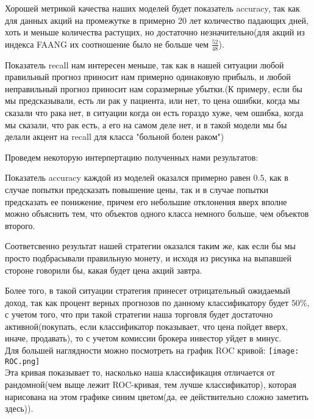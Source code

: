 \documentclass[12pt]{article}
\begin{document}
{Хорошей метрикой качества наших моделей будет показатель accuracy, так как для данных акций на промежутке в примерно 20 лет количество падающих дней, хоть и меньше количества растущих, но достаточно незначительно(для акций из индекса FAANG их соотношение было не больше чем $\frac{52}{48}$).\\
\par Показатель recall нам интересен меньше, так как в нашей ситуации любой правильный прогноз приносит нам примерно одинаковую прибыль, и любой неправильный прогноз приносит нам соразмерные убытки.(К примеру, если бы мы предсказывали, есть ли рак у пациента, или нет, то цена ошибки, когда мы сказали что рака нет, в ситуации когда он есть гораздо хуже, чем ошибка, когда мы сказали, что рак есть, а его на самом деле нет, и в такой модели мы бы делали акцент на recall для класса "больной болен раком")\\ \par
Проведем некоторую интерпертацию полученных нами результатов:\\ \par
Показатель accuracy каждой из моделей оказался примерно равен $0.5$, как в случае попытки предсказать повышение цены, так и в случае попытки предсказать ее понижение, причем его небольшие отклонения вверх вполне можно объяснить тем, что объектов одного класса немного больше, чем объектов второго.\\ \par
Соответсвенно результат нашей стратегии оказался таким же, как если бы мы просто подбрасывали правильную монету, и исходя из рисунка на выпавшей стороне говорили бы, какая будет цена акций завтра.\\ \par
Более того, в такой ситуации стратегия принесет отрицательный ожидаемый доход, так как процент верных прогнозов по данному классификатору будет $50\%$, с учетом того, что при такой стратегии наша торговля будет достаточно активной(покупать, если классификатор показывает, что цена пойдет вверх, иначе, продавать), то с учетом комиссии брокера инвестор уйдет в минус.
\\
Для большей наглядности можно посмотреть на график ROC кривой:
\centering
\texttt{[image: ROC.png]}
\\
Эта кривая показывает то, насколько наша классификация отличается от рандомной(чем выще лежит ROC-кривая, тем лучше классификатор), которая нарисована на этом графике синим цветом(да, ее действительно сложно заметить здесь)).

}
\end{document}
